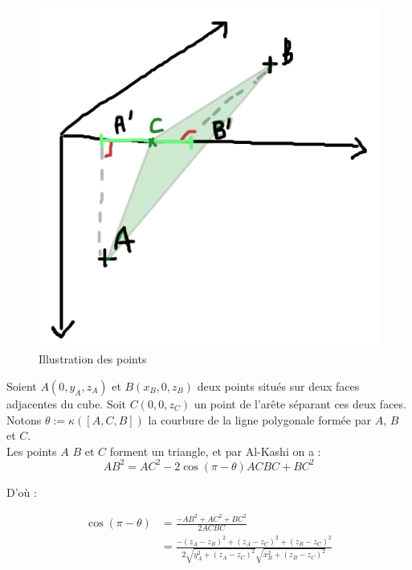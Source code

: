 \documentclass{article}
\begin{document}
\begin{figure}[!h]
    \centering
    \includegraphics[width=0.3\linewidth]{al_kashi.png}
    \caption{Illustration des points}
    \label{fig:al_kashi}
\end{figure}

Soient $A(0, y_A, z_A)$ et $B(x_B, 0, z_B)$ deux points situés sur deux faces adjacentes du cube. Soit $C(0, 0, z_C)$ un point de l'arête séparant ces deux faces.\\
Notons $\theta := \kappa([A, C, B])$ la courbure de la ligne polygonale formée par $A$, $B$ et $C$.\\

Les points $A$ $B$ et $C$ forment un triangle, et par Al-Kashi on a : 
$$ AB^2 = AC^2 - 2 \cos(\pi - \theta)ACBC + BC^2 $$

D'où :

\begin{align*}
    \cos(\pi - \theta) &= \frac{-AB^2 + AC^2 + BC^2}{2AC BC}\\
    &= \frac{-(z_A - z_B)^2 + (z_A - z_C)^2 + (z_B- z_C)^2}{2\sqrt{y_A^2 + (z_A - z_C)^2}\sqrt{x_B^2 + (z_B - z_C)^2}}
\end{align*}
\end{document}
